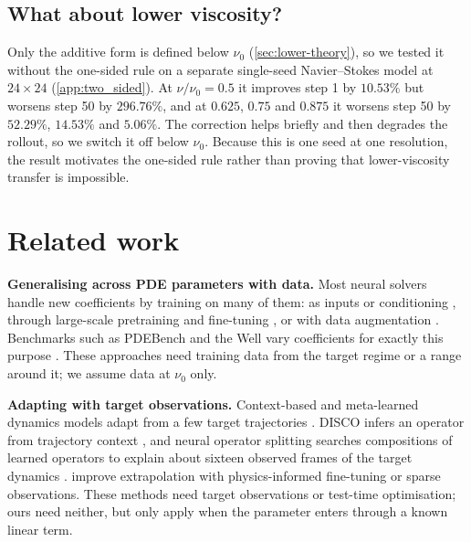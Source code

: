 \documentclass{article}
\theoremstyle{plain}
\begin{document}
\subsection{What about lower viscosity?}
\label{sec:lower}

Only the additive form is defined below $\nu_0$ (\cref{sec:lower-theory}), so we tested it without the one-sided rule on a separate single-seed Navier--Stokes model at $24\times24$ (\cref{app:two_sided}).
At $\nu/\nu_0=0.5$ it improves step 1 by $10.53\%$ but worsens step 50 by $296.76\%$, and at $0.625$, $0.75$ and $0.875$ it worsens step 50 by $52.29\%$, $14.53\%$ and $5.06\%$.
The correction helps briefly and then degrades the rollout, so we switch it off below $\nu_0$.
Because this is one seed at one resolution, the result motivates the one-sided rule rather than proving that lower-viscosity transfer is impossible.

\section{Related work}
\label{sec:related}

\textbf{Generalising across PDE parameters with data.}
Most neural solvers handle new coefficients by training on many of them: as inputs or conditioning \citep{brandstetter2022mpnn,takamoto2023cape,gupta2023multiscale,zhou2025unisolver}, through large-scale pretraining and fine-tuning \citep{subramanian2023foundation,mccabe2024mpp,hao2024dpot,herde2024poseidon}, or with data augmentation \citep{brandstetter2022lpsda}.
Benchmarks such as PDEBench and the Well vary coefficients for exactly this purpose \citep{takamoto2022pdebench,ohana2024well}.
These approaches need training data from the target regime or a range around it; we assume data at $\nu_0$ only.

\textbf{Adapting with target observations.}
Context-based and meta-learned dynamics models adapt from a few target trajectories \citep{yin2021leads,kirchmeyer2022coda,koupai2024geps,serrano2025zebra}.
DISCO infers an operator from trajectory context \citep{morel2025disco}, and neural operator splitting searches compositions of learned operators to explain about sixteen observed frames of the target dynamics \citep{serrano2026splitting}.
\citet{zhu2023extrapolation} improve extrapolation with physics-informed fine-tuning or sparse observations.
These methods need target observations or test-time optimisation; ours need neither, but only apply when the parameter enters through a known linear term.
\end{document}
